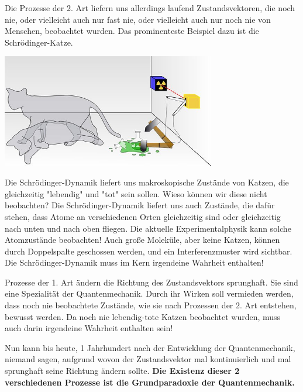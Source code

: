 \documentclass[12pt]{book}
\begin{document}
Die Prozesse der 2. Art liefern uns allerdings laufend Zustandsvektoren, die noch nie, oder vielleicht auch nur fast nie, oder vielleicht auch nur noch nie von Menschen, beobachtet wurden. Das prominenteste Beispiel dazu ist die Schrödinger-Katze.

\begin{center}
\includegraphics[width=0.7\textwidth]{Bilder/Katze.jpg}
\end{center}

Die Schrödinger-Dynamik liefert uns makroskopische Zustände von Katzen, die gleichzeitig "lebendig" und "tot" sein sollen. Wieso können wir diese nicht beobachten? Die Schrödinger-Dynamik liefert uns auch Zustände, die dafür stehen, dass Atome an verschiedenen Orten gleichzeitig sind oder gleichzeitig nach unten und nach oben fliegen. Die aktuelle Experimentalphysik kann solche Atomzustände beobachten! Auch große Moleküle, aber keine Katzen, können durch Doppelspalte geschossen werden, und ein Interferenzmuster wird sichtbar. Die Schrödinger-Dynamik muss im Kern irgendeine Wahrheit enthalten!

Prozesse der 1. Art ändern die Richtung des Zustandsvektors sprunghaft. Sie sind eine Spezialität der Quantenmechanik. Durch ihr Wirken soll vermieden werden, dass noch nie beobachtete Zustände, wie sie nach Prozessen der 2. Art entstehen, bewusst werden. Da noch nie lebendig-tote Katzen beobachtet wurden, muss auch darin irgendeine Wahrheit enthalten sein!

Nun kann bis heute, 1 Jahrhundert nach der Entwicklung der Quantenmechanik, niemand sagen, aufgrund wovon der Zustandsvektor mal kontinuierlich und mal sprunghaft seine Richtung ändern sollte. \textbf{Die Existenz dieser 2 verschiedenen Prozesse ist die Grundparadoxie der Quantenmechanik.}

\end{document}
